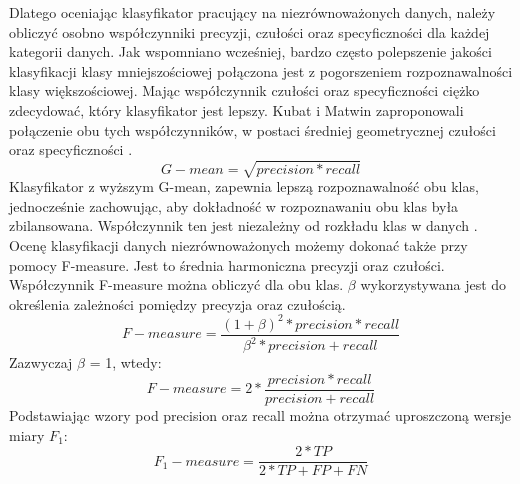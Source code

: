 Dlatego oceniając klasyfikator pracujący na niezrównoważonych danych, należy obliczyć osobno współczynniki precyzji, czułości oraz specyficzności dla każdej kategorii danych. Jak wspomniano wcześniej, bardzo często polepszenie jakości klasyfikacji klasy mniejszościowej połączona jest z pogorszeniem rozpoznawalności klasy większościowej. Mając współczynnik czułości oraz specyficzności ciężko zdecydować, który klasyfikator jest lepszy. Kubat i Matwin zaproponowali połączenie obu tych współczynników, w postaci średniej geometrycznej czułości oraz specyficzności \cite{KubatMatwin}. 
\[G-mean = \sqrt{precision*recall}\]
Klasyfikator z wyższym G-mean, zapewnia lepszą rozpoznawalność obu klas, jednocześnie zachowując, aby dokładność w rozpoznawaniu obu klas była zbilansowana. Współczynnik ten jest niezależny od rozkładu klas w danych \cite{Garcia}.
\\
Ocenę klasyfikacji danych niezrównoważonych możemy dokonać także przy pomocy F-measure. Jest to średnia harmoniczna precyzji oraz czułości. Współczynnik F-measure można obliczyć dla obu klas. $\beta$ wykorzystywana jest do określenia zależności pomiędzy precyzja oraz czułością.
\[F-measure= \frac{(1+\beta)^2*precision*recall}{\beta^2*precision+recall}\]
Zazwyczaj $\beta$ = 1, wtedy:
\[F-measure= 2*\frac{precision*recall}{precision+recall}\]
Podstawiając wzory pod precision oraz recall można otrzymać uproszczoną wersje miary $F_1$:
\[F_1-measure= \frac{2*TP}{2*TP+FP+FN}\]

